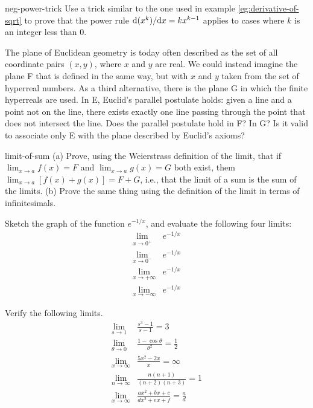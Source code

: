 \begin{hwsection}
\begin{hwwithsoln}[2]{neg-power-trick}
Use a trick similar to the one used in example \ref{eg:derivative-of-sqrt} to prove that the power
rule $\textup{d}(x^k)/\textup{d} x=kx^{k-1}$ applies to cases where $k$ is an integer less than 0.
\end{hwwithsoln}

\begin{hw}[2]
The plane of Euclidean geometry is today often described as the set of all coordinate pairs $(x,y)$, where
$x$ and $y$ are real. We could instead imagine the plane F that is defined in the same way, but with $x$ and $y$ taken from the
set of hyperreal numbers. As a third alternative, there is the plane G in which the finite hyperreals are used.
In E, Euclid's parallel postulate holds: given a line and a point not on the line, there exists exactly one line passing
through the point that does not intersect the line. Does the parallel postulate hold in F? In G?
Is it valid to associate only E with the plane described by Euclid's axioms?
\end{hw}

\begin{hwwithsoln}{limit-of-sum}
(a) Prove, using the Weierstrass definition of the limit, that if $\lim_{x\rightarrow a} f(x) = F$ and $\lim_{x\rightarrow a} g(x) = G$ both exist,
them $\lim_{x\rightarrow a} [f(x)+g(x)] = F+G$, i.e., that the limit of a sum is the sum of the limits. (b) Prove the same thing using the
definition of the limit in terms of infinitesimals.
\end{hwwithsoln}

\begin{hw}
Sketch the graph of the function $e^{-1/x}$, and evaluate the following four limits:
\begin{align*}
  \lim_{x\rightarrow 0^{+}} & e^{-1/x} \\
  \lim_{x\rightarrow 0^{-}} & e^{-1/x} \\
  \lim_{x\rightarrow +\infty} & e^{-1/x} \\
  \lim_{x\rightarrow -\infty} & e^{-1/x} 
\end{align*}
\end{hw}

\begin{hw}
Verify the following limits.
\begin{align*}
  \lim_{s\rightarrow 1} & \frac{s^3-1}{s-1} = 3 \\
  \lim_{\theta\rightarrow 0} & \frac{1-\cos\theta}{\theta^2} = \frac{1}{2} \\
  \lim_{x\rightarrow \infty} & \frac{5x^2-2x}{x} = \infty \\
  \lim_{n\rightarrow \infty} & \frac{n(n+1)}{(n+2)(n+3)} = 1 \\
  \lim_{x\rightarrow \infty} & \frac{ax^2+bx+c}{dx^2+ex+f} = \frac{a}{d}
\end{align*}
\granville
\end{hw}


\end{hwsection}
